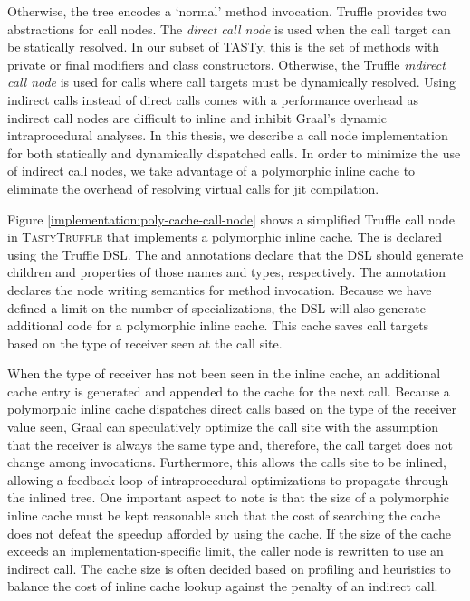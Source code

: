 Otherwise, the  tree encodes a `normal' method invocation.
Truffle provides two abstractions for call nodes.
The \textit{direct call node} is used when the call target can be statically resolved. 
In our subset of TASTy, this is the set of methods with private or final modifiers\cite{java:lang-spec} and class constructors. 
Otherwise, the Truffle \textit{indirect call node} is used for calls where call targets must be dynamically resolved. 
Using indirect calls instead of direct calls comes with a performance overhead as indirect call nodes are difficult to inline and inhibit Graal's dynamic intraprocedural analyses.
In this thesis, we describe a call node implementation for both statically and dynamically dispatched calls. 
In order to minimize the use of indirect call nodes, we take advantage of a polymorphic inline cache\cite{self:polymorphic-inline-caches} to eliminate the overhead of resolving virtual calls for \acrshort{jit} compilation. 

Figure \ref{implementation:poly-cache-call-node} shows a simplified Truffle call node in \textsc{TastyTruffle} that implements a polymorphic inline cache.
The  is declared using the Truffle DSL.
The  and  annotations declare that the DSL should generate children and properties of those names and types, respectively. 
The  annotation declares the node writing semantics for method invocation.
Because we have defined a limit on the number of specializations, the DSL will also generate additional code for a polymorphic inline cache.
This cache saves call targets based on the type of receiver seen at the call site. 

When the type of receiver has not been seen in the inline cache, an additional cache entry is generated and appended to the cache for the next call.
Because a polymorphic inline cache dispatches direct calls based on the type of the receiver value seen, Graal can speculatively optimize the call site with the assumption that the receiver is always the same type and, therefore, the call target does not change among invocations.
Furthermore, this allows the calls site to be inlined, allowing a feedback loop of intraprocedural optimizations\cite{conditional-constant-prop,variable-congruence} to propagate through the inlined tree.
One important aspect to note is that the size of a polymorphic inline cache must be kept reasonable such that the cost of searching the cache does not defeat the speedup afforded by using the cache.
If the size of the cache exceeds an implementation-specific limit, the caller node is rewritten to use an indirect call.
The cache size is often decided based on profiling and heuristics to balance the cost of inline cache lookup against the penalty of an indirect call. 

